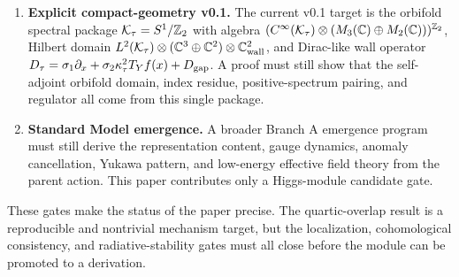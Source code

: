 \documentclass[11pt]{article}
\begin{document}
\begin{enumerate}
single-package scaffold isolates the remaining absolute unit as
$\epsilon_\tau$ inside
$\Lambda_A=C_A\epsilon_\tau\mu_\tau({\cal K}_\tau)N_\tau\hat E_{\rm wall}$.
A proof must still specify the geometry/topology/spectral structure of
${\cal K}_\tau$, derive this universal parent density or stress-energy
scale, derive $C_A$, and show that the Branch A wall domain is induced from the
same compact tau cell rather than declared as a disconnected Higgs-sector
input. The most useful positive result would be a compact spectral or cell
geometry whose low-lying sector selects the $3+2$ stabilizer and whose defect
sector induces the hypercharge wall.
\item \textbf{Explicit compact-geometry v0.1.} The current v0.1 target is
the orbifold spectral package ${\cal K}_\tau=S^1/\mathbb Z_2$ with algebra
$(C^\infty({\cal K}_\tau)\otimes(M_3(\mathbb C)\oplus M_2(\mathbb C)))^{\mathbb Z_2}$,
Hilbert domain
$L^2({\cal K}_\tau)\otimes(\mathbb C^3\oplus\mathbb C^2)\otimes\mathbb C^2_{\rm wall}$,
and Dirac-like wall operator
$D_\tau=\sigma_1\partial_x+\sigma_2\kappa_\tau^2T_Yf(x)+D_{\rm gap}$.
A proof must still show that the self-adjoint orbifold domain, index residue,
positive-spectrum pairing, and regulator all come from this single package.
\item \textbf{Standard Model emergence.} A broader Branch A emergence program
must still derive the representation content, gauge dynamics, anomaly
cancellation, Yukawa pattern, and low-energy effective field theory from the
parent action. This paper contributes only a Higgs-module candidate gate.
\end{enumerate}

These gates make the status of the paper precise. The quartic-overlap result is
a reproducible and nontrivial mechanism target, but the localization,
cohomological consistency, and radiative-stability gates must all close before
the module can be promoted to a derivation.
\end{document}
